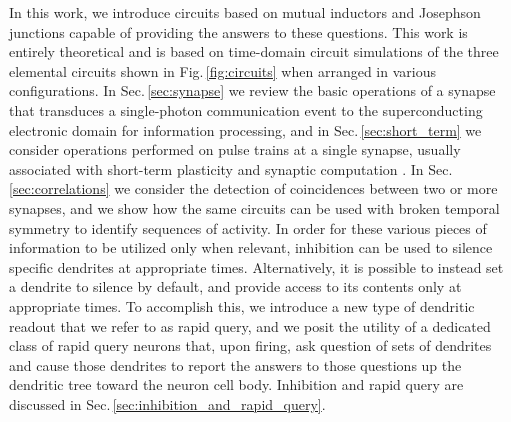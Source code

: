 \documentclass[twocolumn]{article}
\begin{document}
\begin{figure} 
\end{figure}
In this work, we introduce circuits based on mutual inductors and Josephson junctions capable of providing the answers to these questions. This work is entirely theoretical and is based on time-domain circuit simulations of the three elemental circuits shown in Fig.\,\ref{fig:circuits} when arranged in various configurations. In Sec.\,\ref{sec:synapse} we review the basic operations of a synapse that transduces a single-photon communication event to the superconducting electronic domain for information processing, and in Sec.\,\ref{sec:short_term} we consider operations performed on pulse trains at a single synapse, usually associated with short-term plasticity and synaptic computation \cite{abre2004}. In Sec.\,\ref{sec:correlations} we consider the detection of coincidences between two or more synapses, and we show how the same circuits can be used with broken temporal symmetry to identify sequences of activity. In order for these various pieces of information to be utilized only when relevant, inhibition can be used to silence specific dendrites at appropriate times. Alternatively, it is possible to instead set a dendrite to silence by default, and provide access to its contents only at appropriate times. To accomplish this, we introduce a new type of dendritic readout that we refer to as rapid query, and we posit the utility of a dedicated class of rapid query neurons that, upon firing, ask question of sets of dendrites and cause those dendrites to report the answers to those questions up the dendritic tree toward the neuron cell body. Inhibition and rapid query are discussed in Sec.\,\ref{sec:inhibition_and_rapid_query}. 
\end{document}
